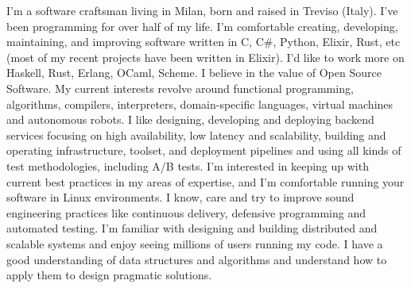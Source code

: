 \documentclass[9pt]{developercv}
\begin{document}
\begin{minipage}[t]{0.6\textwidth}
	\vspace{-\baselineskip}
	I'm a software craftsman living in Milan, born and raised in Treviso (Italy). I've been programming for over half of my life. I'm comfortable creating, developing, maintaining, and improving software written in C, C\#, Python, Elixir, Rust, etc (most of my recent projects have been written in Elixir). I'd like to work more on Haskell, Rust, Erlang, OCaml, Scheme. I believe in the value of Open Source Software. My current interests revolve around functional programming, algorithms, compilers, interpreters, domain-specific languages, virtual machines and autonomous robots. I like designing, developing and deploying backend services focusing on high availability, low latency and scalability, building and operating infrastructure, toolset, and deployment pipelines and using all kinds of test methodologies, including A/B tests. I'm interested in keeping up with current best practices in my areas of expertise, and I'm comfortable running your software in Linux environments. I know, care and try to improve sound engineering practices like continuous delivery, defensive programming and automated testing. I'm familiar with designing and building distributed and scalable systems and enjoy seeing millions of users running my code. I have a good understanding of data structures and algorithms and understand how to apply them to design pragmatic solutions.
\end{minipage}
\hfill
\begin{minipage}[t]{0.4\textwidth}
	\vspace{-\baselineskip}
	\begin{barchart}{5.5}
	\end{barchart}
\end{minipage}


\end{document}
